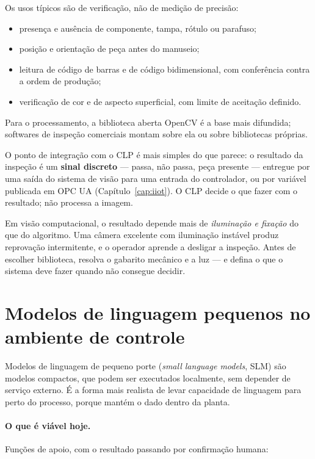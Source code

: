 Os usos típicos são de verificação, não de medição de precisão:

\begin{itemize}
  \item presença e ausência de componente, tampa, rótulo ou parafuso;
  \item posição e orientação de peça antes do manuseio;
  \item leitura de código de barras e de código bidimensional, com conferência contra a ordem de
        produção;
  \item verificação de cor e de aspecto superficial, com limite de aceitação definido.
\end{itemize}

Para o processamento, a biblioteca aberta OpenCV é a base mais difundida; softwares de inspeção
comerciais montam sobre ela ou sobre bibliotecas próprias.

O ponto de integração com o CLP é mais simples do que parece: o resultado da inspeção é um
\textbf{sinal discreto} --- passa, não passa, peça presente --- entregue por uma saída do sistema de
visão para uma entrada do controlador, ou por variável publicada em OPC UA
(Capítulo~\ref{cap:iiot}). O CLP decide o que fazer com o resultado; não processa a imagem.

\begin{atencao}
Em visão computacional, o resultado depende mais de \emph{iluminação e fixação} do que do algoritmo.
Uma câmera excelente com iluminação instável produz reprovação intermitente, e o operador aprende a
desligar a inspeção. Antes de escolher biblioteca, resolva o gabarito mecânico e a luz --- e defina o
que o sistema deve fazer quando não consegue decidir.
\end{atencao}

\section{Modelos de linguagem pequenos no ambiente de controle}

Modelos de linguagem de pequeno porte (\emph{small language models}, SLM) são modelos compactos, que
podem ser executados localmente, sem depender de serviço externo. É a forma mais realista de levar
capacidade de linguagem para perto do processo, porque mantém o dado dentro da planta.

\paragraph{O que é viável hoje.} Funções de apoio, com o resultado passando por confirmação humana:


